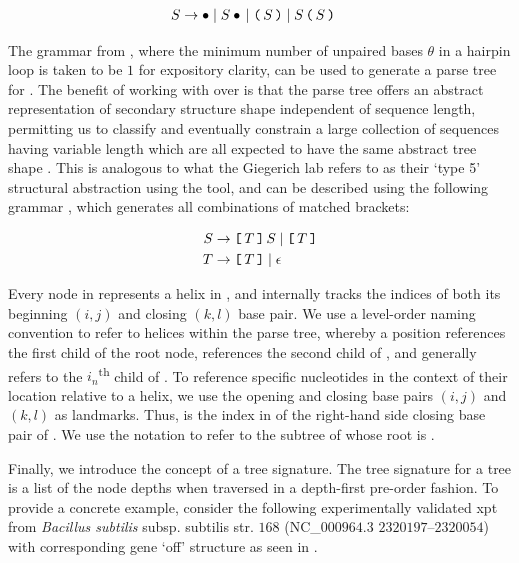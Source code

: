 \begin{align}
\label{eq:rfinder:strCfg}
S &\rightarrow \bullet \;|\; S \bullet \,|\; \bpL S \bpR \;|\; S\, \bpL S \bpR
\end{align}

The grammar from ,
where the minimum number of unpaired bases $\theta$ in a hairpin loop
is taken to be $1$ for expository clarity,
can be used to generate a parse tree
\tree for \strS. The benefit of working with \tree over \strS is that the parse
tree offers an abstract representation of secondary structure shape independent of
sequence length, permitting us to classify and eventually constrain a large
collection of sequences having variable length which are all expected to have the
same abstract tree shape \citep{voss:2006iq}. This is analogous to what
the Giegerich lab refers to as
their `type 5' structural abstraction using the \rshapes tool, and can be
described using the following grammar \citep{Lorenz:2008gz}, which generates
all combinations of matched brackets:

\begin{align}
\label{eq:rfinder:shapeCfg}
\begin{split}
S &\rightarrow \brL T \brR\, S \;|\; \brL T \brR \\
T &\rightarrow \brL T \brR \;|\; \epsilon \\
\end{split}
\end{align}

Every node in \tree
represents a helix in \strS, and internally tracks the indices of both its
beginning $(i,j)$ and closing $(k,l)$ base pair. We use a level-order naming
convention to refer to helices within the parse tree, whereby a position
 references the first child of the root node, 
references the second child of , and generally
 refers to the $i_n$\textsuperscript{th} child of
. To reference specific nucleotides in the
context of their location relative to a helix, we use the opening and closing base
pairs $(i,j)$ and $(k,l)$ as landmarks. Thus,  is the index in
\strS of the right-hand side closing base pair of . We use the
notation  to refer to the subtree of \tree whose root is
.

Finally, we introduce the concept of a tree signature. The tree signature for a
tree \tree is a list of the node depths when traversed in a depth-first pre-order
fashion. To provide a concrete example, consider the following experimentally
validated xpt \grb from {\em Bacillus subtilis} subsp. subtilis str. $168$
(NC\_$000964.3$ $2320197$--$2320054$) with corresponding gene `off' structure as seen in
.
\medskip

